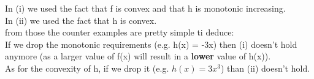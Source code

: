 \documentclass[fleqn]{article}
\begin{document}
In (i) we used the fact that f is convex and that h is monotonic increasing. \\

In (ii) we used the fact that h is convex.\\

from those the counter examples are pretty simple ti deduce: \\

If we drop the monotonic requirements (e.g. h(x) = -3x) then (i) doesn't hold anymore (as a larger value of f(x) will result in a \textbf{lower} value of h(x)). \\

As for the convexity of h, if we drop it (e.g. $h(x)=3x^3$) than (ii) doesn't hold. \\
\end{document}
